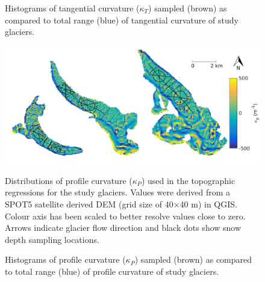 \documentclass[12pt]{article}
\newcommand{\topomap}{Arrows indicate glacier flow direction and black dots show snow depth sampling locations.}
\begin{document}
\begin{figure}[H]
	\caption{Histograms of tangential curvature ($\kappa_T$) sampled (brown) as compared to total range (blue) of tangential curvature of study glaciers.}
	\label{sampledRange:tangentC}
\end{figure}

\begin{figure}[H]
	\centering
	\includegraphics[width=\textwidth]{Map_profileCurve.png}\\
	\caption{Distributions of profile curvature ($\kappa_P$) used in the topographic regressions for the study glaciers. Values were derived from a SPOT5 satellite derived DEM (grid size of 40$\times$40 m) in QGIS. Colour axis has been scaled to better resolve values close to zero. \topomap}
	\label{map:profileC}
\end{figure}

\begin{figure}[H]
	\caption{Histograms of profile curvature ($\kappa_P$) sampled (brown) as compared to total range (blue) of profile curvature of study glaciers.}
	\label{sampledRange:profileC}
\end{figure}
\end{document}
